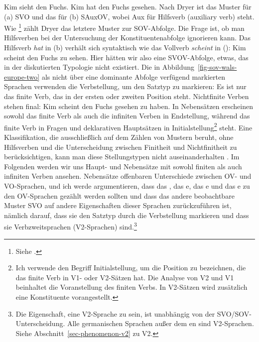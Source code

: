 \eal
\ex
Kim sieht den Fuchs.
\ex
Kim hat den Fuchs gesehen.
\zl
Nach Dryer ist das Muster für (a) SVO und das für (b) SAuxOV, wobei Aux
für Hilfsverb (auxiliary verb) steht. Wie
\citet{Greenberg63a-u}\footnote{%
  Siehe .
} zählt Dryer das letztere Muster zur SOV-Abfolge. Die Frage ist, ob man Hilfsverben
bei der Untersuchung der Konstituentenabfolge ignorieren kann. Das Hilfsverb \emph{hat} in (b) verhält sich syntaktisch
wie das Vollverb \emph{scheint} in ():
\ea
Kim scheint den Fuchs zu sehen.
\z
Hier hätten wir also eine SVOV-Abfolge, etwas, das in der diskutierten Typologie nicht existiert.
Die in Abbildung~\ref{fig-sov-wals-europe-two} als nicht über eine dominante Abfolge verfügend markierten Sprachen verwenden die
Verbstellung, um den Satztyp zu markieren: Es ist nur das finite Verb, das in der ersten oder zweiten
Position steht. Nichtfinite Verben stehen final:
\ea
Kim scheint den Fuchs gesehen zu haben.
\z
In Nebensätzen erscheinen sowohl das finite Verb als auch die infiniten Verben in Endstellung, während
das finite Verb in Fragen und deklarativen Hauptsätzen in Initialstellung\footnote{%
  Ich verwende den Begriff Initialstellung, um die Position zu bezeichnen, die das finite Verb in V1- oder V2-Sätzen hat. Die
  Analyse von V2 und V1 beinhaltet die Voranstellung des finiten Verbs. In V2-Sätzen wird zusätzlich
  eine Konstituente vorangestellt.
} steht.
Eine Klassifikation, die ausschließlich auf dem Zählen von Mustern beruht, ohne Hilfsverben und die
Unterscheidung zwischen Finitheit und Nichtfinitheit zu berücksichtigen, kann man diese Stellungstypen nicht auseinanderhalten \citep[Abschnitt~3]{HoehleTopo}. Im Folgenden werden wir uns Haupt- und Nebensätze mit
sowohl finiten als auch infiniten Verben ansehen. Nebensätze offenbaren Unterschiede zwischen OV- und VO-Sprachen, und ich werde argumentieren, dass das , das e,
das e und das e zu den OV-Sprachen gezählt werden sollten und dass das andere beobachtbare Muster
SVO auf andere Eigenschaften dieser Sprachen zurückzuführen ist, nämlich darauf, dass sie den Satztyp durch die Verbstellung
markieren und dass sie Verbzweitsprachen (V2-Sprachen) sind.\footnote{%
  Die Eigenschaft, eine V2-Sprache zu sein, ist unabhängig von der SVO/SOV-Unterscheidung. Alle germanischen
  Sprachen außer dem en sind V2-Sprachen. Siehe Abschnitt~\ref{sec-phenomenon-v2} zu V2.
}

